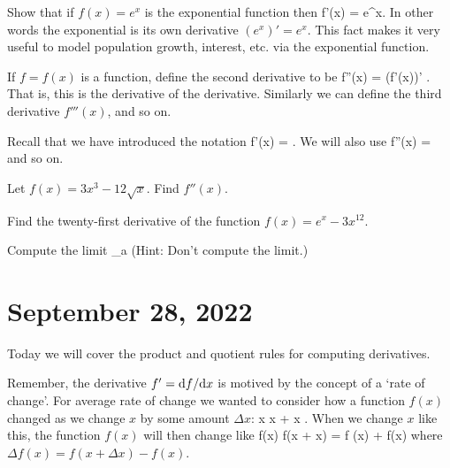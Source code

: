 \documentclass[11pt]{amsart}
\begin{document}
\begin{eg}
Show that if $f(x) = e^x$ is the exponential function then
\beqn
f'(x) = e^x.
\eeqn
In other words the exponential is its own derivative $(e^x)'=e^x$.
This fact makes it very useful to model population growth, interest, etc. via the exponential function.
\end{eg}

\newpage

If $f = f(x)$ is a function, define the second derivative to be 
\beqn
f''(x) = (f'(x))' .
\eeqn
That is, this is the derivative of the derivative. 
Similarly we can define the third derivative $f'''(x)$, and so on. 

Recall that we have introduced the notation
\beqn
f'(x) =  .
\eeqn
We will also use
\beqn
f''(x) =  
\eeqn
and so on.

\begin{eg}
Let $f(x) = 3x^3 - 12 \sqrt{x}$.
Find $f''(x)$. 
\end{eg}

\vspace{3cm}

\begin{eg}
Find the twenty-first derivative of the function $f(x) = e^x - 3 x^{12}$. 
\end{eg}

\vspace{5cm}

\begin{eg}
Compute the limit 
\beqn
\lim_{a } 
\eeqn
(Hint: Don't compute the limit.)
\end{eg}

\newpage

\section{September 28, 2022}

Today we will cover the product and quotient rules for computing derivatives. 

Remember, the derivative $f' = {\rm d} f / {\rm d} x$ is motived by the concept of a `rate of change'. 
For average rate of change we wanted to consider how a function $f(x)$ changed as we change $x$ by some amount $\Delta x$:
\beqn
x \rightsquigarrow x + \Delta x .
\eeqn
When we change $x$ like this, the function $f(x)$ will then change like
\beqn
f(x) \rightsquigarrow f(x + \Delta x) = f (x) + \Delta f(x) 
\eeqn
where $\Delta f(x) = f(x+\Delta x) -f(x)$. 
\end{document}
